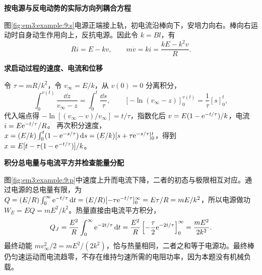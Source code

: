 \begin{solution}\textbf{按电源与反电动势的实际方向列耦合方程}\par\nobreak
图\ref{fig:em3:example:9:s}电源正端接上轨，初电流沿棒向下，安培力向右。棒向右运动时自身动生作用向上，反抗电源。因此令 $k=Bl$，有
\[Ri=E-kv,\qquad m\dot v=ki=\frac{kE-k^2v}{R}.\]


\par\medskip{}\noindent\textbf{求启动过程的速度、电流和位移}\par\nobreak
令 $\tau=mR/k^2$，令 $v_\infty=E/k$，从 $v(0)=0$ 分离积分，
\[
\int_0^{v(t)}\frac{\dd z}{v_\infty-z}=\int_0^t\frac{\dd s}{\tau},
 \qquad[-\ln(v_\infty-z)]_0^{v(t)}=\frac1\tau[s]_0^t,
\]
代入端点得 $-\ln[(v_\infty-v)/v_\infty]=t/\tau$，指数化后
$v=E(1-\mathrm e^{-t/\tau})/k$，电流 $i=E\mathrm e^{-t/\tau}/R$。
再次积分速度，
$x=(E/k)\int_0^t(1-\mathrm e^{-s/\tau})\mathop{}\!\mathrm d s
=(E/k)[s+\tau\mathrm e^{-s/\tau}]_0^t$，得到 $x=E[t-\tau(1-\mathrm e^{-t/\tau})]/k$。



\par\medskip{}\noindent\textbf{积分总电量与电流平方并检查能量分配}\par\nobreak
图\ref{fig:em3:example:9:p}中速度上升而电流下降，二者的初态与极限相互对应。通过电源的总电量有限，为
$Q=(E/R)\int_0^\infty\mathrm e^{-t/\tau}\mathop{}\!\mathrm d t
=(E/R)[-\tau\mathrm e^{-t/\tau}]_0^\infty
=E\tau/R=mE/k^2$，所以电源做功 $W_E=EQ=mE^2/k^2$。热量直接由电流平方积分，
\[Q_J=\frac{E^2}{R}\int_0^\infty\mathrm e^{-2t/\tau}\mathop{}\!\mathrm d t
=\frac{E^2}{R}\left[-\frac\tau2\mathrm e^{-2t/\tau}\right]_0^\infty
=\frac{mE^2}{2k^2}.\]
最终动能 $mv_\infty^2/2=mE^2/(2k^2)$，恰与热量相同，二者之和等于电源功。最终棒仍匀速运动而电流趋零，不存在维持匀速所需的电阻功率，因为本题没有机械负载。\end{solution}
